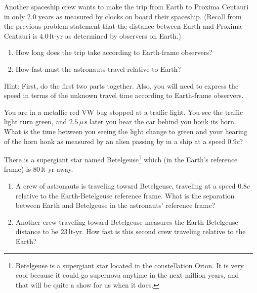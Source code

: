 \begin{exercise}
Another spaceship crew wants to make the trip from Earth to
Proxima Centauri in only 2.0 years as measured by clocks on board their
spaceship.  (Recall from the previous problem statement that the 
distance between Earth and Proxima Centauri is $4.0\,\text{lt-yr}$ 
as determined by observers on Earth.) 
    \begin{enumerate}
    \item How long does the trip take according to Earth-frame observers?
    \item How fast must the astronauts travel relative to Earth? 
    \end{enumerate}
Hint: First, do the first two parts together.  Also, you will need
to express the speed in terms of the unknown travel time according to
Earth-frame observers.  
\label{prob:alpha_centauri2}
\end{exercise}

\begin{exercise}
You are in a metallic red VW bug stopped at a traffic light.
You see the traffic light turn green, and $2.5\,\mu\,\text{s}$ later you hear
the car behind you honk its horn.  What is the time between you 
seeing the light change to green and your hearing of the horn honk 
as measured by an 
alien passing by in a ship at a speed $0.9c$?
\end{exercise}

\begin{exercise}
There is a supergiant star named Betelgeuse\footnote{Betelgeuse
is a supergiant star located in the constellation Orion.  It is very
cool because it could go supernova anytime in the next million years,
and that will be quite a show for us when it does.} which (in the
Earth's reference frame) is $80\,\text{lt-yr}$ away.  
    \begin{enumerate}
    \item A crew of astronauts is traveling toward Betelgeuse,
    traveling at a speed $0.8c$ relative to the Earth-Betelgeuse
    reference frame.  What is the separation between Earth and
    Betelgeuse in the astronauts' reference frame?
    \item Another crew traveling toward Betelgeuse measures the
    Earth-Betelgeuse distance to be $23\,\text{lt-yr}$.  How fast is this 
    second crew traveling relative to the Earth?
    \end{enumerate}
\label{prob:betelgeuse}
\end{exercise}

